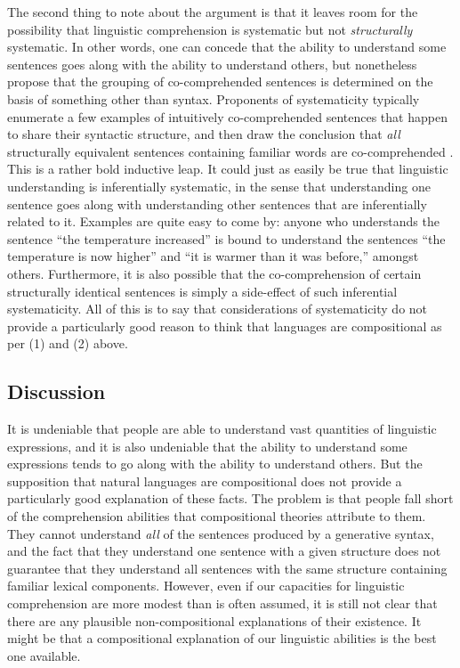 The second thing to note about the argument is that it leaves room for the possibility that linguistic comprehension is systematic but not \textit{structurally} systematic. In other words, one can concede that the ability to understand some sentences goes along with the ability to understand others, but nonetheless propose that the grouping of co-comprehended sentences is determined on the basis of something other than syntax. Proponents of systematicity typically enumerate a few examples of intuitively co-comprehended sentences that happen to share their syntactic structure, and then draw the conclusion that \textit{all} structurally equivalent sentences containing familiar words are co-comprehended \citep[e.g.,][]{FodorPylyshyn:1988}. This is a rather bold inductive leap. It could just as easily be true that linguistic understanding is inferentially systematic, in the sense that understanding one sentence goes along with understanding other sentences that are inferentially related to it. Examples are quite easy to come by: anyone who understands the sentence ``the temperature increased'' is bound to understand the sentences ``the temperature is now higher'' and ``it is warmer than it was before,'' amongst others. Furthermore, it is also possible that the co-comprehension of certain structurally identical sentences is simply a side-effect of such inferential systematicity. All of this is to say that considerations of systematicity do not provide a particularly good reason to think that languages are compositional as per (1) and (2) above. 

\subsection{Discussion}

It is undeniable that people are able to understand vast quantities of linguistic expressions, and it is also undeniable that the ability to understand some expressions tends to go along with the ability to understand others. But the supposition that natural languages are compositional does not provide a particularly good explanation of these facts. The problem is that people fall short of the comprehension abilities that compositional theories attribute to them. They cannot understand \textit{all} of the sentences produced by a generative syntax, and the fact that they understand one sentence with a given structure does not guarantee that they understand all sentences with the same structure containing familiar lexical components. However, even if our capacities for linguistic comprehension are more modest than is often assumed, it is still not clear that there are any plausible non-compositional explanations of their existence. It might be that a compositional explanation of our linguistic abilities is the best one available. 

